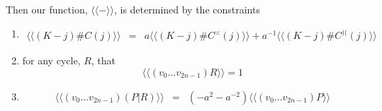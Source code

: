 \documentclass[]{llncs}
\begin{document}

Then our function, $\langle\!\langle - \rangle\!\rangle$, is determined by the constraints

\begin{enumerate}
  \item \begin{eqnarray}
      \langle\!\langle(K-j) \# C(j)\rangle\!\rangle & = & a \langle\!\langle(K-j) \# C^{\asymp}(j)\rangle\!\rangle  + a^{-1} \langle\!\langle(K-j) \# C^{)(}(j)\rangle\!\rangle
    \end{eqnarray}

  \item for any cycle, $R$, that 
    \begin{equation}
      \langle\!\langle( v_0 ... v_{2n-1})R\rangle\!\rangle = 1
    \end{equation}

  \item \begin{eqnarray}
      \langle\!\langle( v_0 ... v_{2n-1})(P | R)\rangle\!\rangle & = & (-a^2 - a^{-2})\langle\!\langle( v_0 ... v_{2n-1})P\rangle\!\rangle
    \end{eqnarray}
  \end{enumerate}
\end{document}
